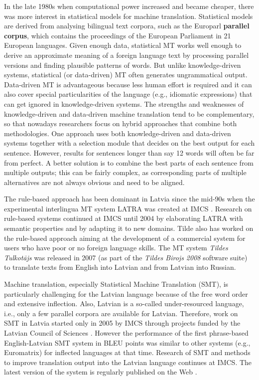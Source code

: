 \begin{multicols}{2}
In the late 1980s when computational power increased and became cheaper, there was more interest in statistical models for machine translation.
Statistical models are derived from analysing bilingual text corpora, such as the Europarl \textbf{parallel corpus}, which contains the proceedings of the European Parliament in 21 European languages.
Given enough data, statistical MT works well enough to derive an approximate meaning of a foreign language text by processing parallel versions and finding plausible patterns of words.
But unlike knowledge-driven systems, statistical (or data-driven) MT often generates ungrammatical output.
Data-driven MT is advantageous because less human effort is required and it can also cover special particularities of the language (e.g., idiomatic expressions) that can get ignored in knowledge-driven systems.
The strengths and weaknesses of knowledge-driven and data-driven machine translation tend to be complementary, so that nowadays researchers focus on hybrid approaches that combine both methodologies.
One approach uses both knowledge-driven and data-driven systems together with a selection module that decides on the best output for each sentence.
However, results for sentences longer than say 12 words will often be far from perfect.
A better solution is to combine the best parts of each sentence from multiple outputs; this can be fairly complex, as corresponding parts of multiple alternatives are not always obvious and need to be aligned. 

The rule-based approach has been dominant in Latvia since the mid-90s when the experimental interlingua MT system LATRA was created at IMCS \cite{Meta23}.
Research on rule-based systems continued at IMCS until 2004 by elaborating LATRA with semantic properties and by adapting it to new domains.
Tilde also has worked on the rule-based approach aiming at the development of a commercial system for users who have poor or no foreign language skills.
The MT system \textit{Tildes Tulkotājs} \cite{Meta24} was released in 2007 (as part of the \textit{Tildes Birojs 2008} software suite) to translate texts from English into Latvian and from Latvian into Russian. 

Machine translation, especially Statistical Machine Translation (SMT), is particularly challenging for the Latvian language because of the free word order and extensive inflection.
Also, Latvian is a so-called under-resourced language, i.e., only a few parallel corpora are available for Latvian.
Therefore, work on SMT in Latvia started only in 2005 by IMCS through projects funded by the Latvian Council of Sciences \cite{Meta25, Meta26}.
However the performance of the first phrase-based English-Latvian SMT system in BLEU points was similar to other systems (e.g., Euromatrix) for inflected languages at that time.
Research of SMT and methods to improve translation output into the Latvian language continues at IMCS.
The latest version of the system is regularly published on the Web \cite{Meta27}.


\end{multicols}
